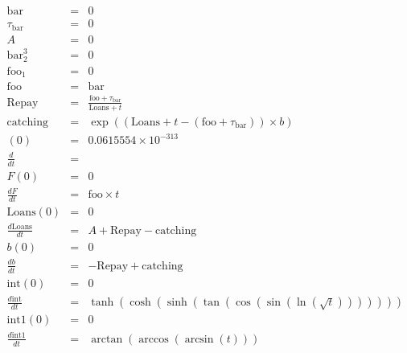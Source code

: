 \documentclass{article}
\begin{document}
\begin{eqnarray*}
\mathrm{bar}&=&0\\
\tau_{\mathrm{bar}}&=&0\\
A&=&0\\
\mathrm{bar}_2^3&=&0\\
\mathrm{foo}_1&=&0\\
\mathrm{foo}&=&\mathrm{bar}\\
\mathrm{Repay}&=&\frac{\mathrm{foo}+\tau_{\mathrm{bar}}}{\mathrm{Loans}+ t }\\
\mathrm{catching}&=&\exp\left(\left(\mathrm{Loans}+ t -\left(\mathrm{foo}+\tau_{\mathrm{bar}}\right)\right)\times b\right)\\
\mathrm{}(0)&=&0.0615554\times10^{-313}\\
\frac{ d \mathrm{}}{dt} &=&\\
F(0)&=&0\\
\frac{ d F}{dt} &=&\mathrm{foo}\times  t \\
\mathrm{Loans}(0)&=&0\\
\frac{ d \mathrm{Loans}}{dt} &=&A+\mathrm{Repay}-\mathrm{catching}\\
b(0)&=&0\\
\frac{ d b}{dt} &=&-\mathrm{Repay}+\mathrm{catching}\\
\mathrm{int}(0)&=&0\\
\frac{ d \mathrm{int}}{dt} &=&\tanh\left(\cosh\left(\sinh\left(\tan\left(\cos\left(\sin\left(\ln\left(\sqrt{ t }\right)\right)\right)\right)\right)\right)\right)\\
\mathrm{int1}(0)&=&0\\
\frac{ d \mathrm{int1}}{dt} &=&\arctan\left(\arccos\left(\arcsin\left( t \right)\right)\right)\\
\end{eqnarray*}
\end{document}
